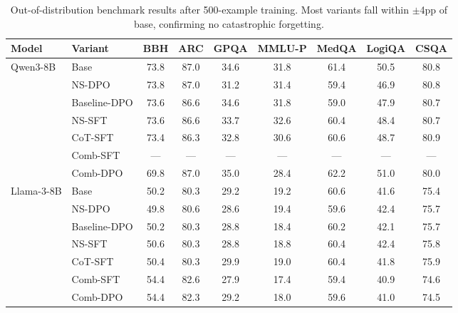 \begin{table}[t]
\centering
\caption{Out-of-distribution benchmark results after 500-example training. Most variants fall within $\pm$4pp of base, confirming no catastrophic forgetting.}
\label{tab:ood}
\small
\setlength{\tabcolsep}{3.5pt}
\begin{tabular}{ll ccccccc}
\toprule
Model & Variant & BBH & ARC & GPQA & MMLU-P & MedQA & LogiQA & CSQA \\
\midrule
Qwen3-8B & Base         & 73.8 & 87.0 & 34.6 & 31.8 & 61.4 & 50.5 & 80.8 \\
         & NS-DPO       & 73.8 & 87.0 & 31.2 & 31.4 & 59.4 & 46.9 & 80.8 \\
         & Baseline-DPO & 73.6 & 86.6 & 34.6 & 31.8 & 59.0 & 47.9 & 80.7 \\
         & NS-SFT       & 73.6 & 86.6 & 33.7 & 32.6 & 60.4 & 48.4 & 80.7 \\
         & CoT-SFT      & 73.4 & 86.3 & 32.8 & 30.6 & 60.6 & 48.7 & 80.9 \\
         & Comb-SFT     & --- & --- & --- & --- & --- & --- & --- \\
         & Comb-DPO     & 69.8 & 87.0 & 35.0 & 28.4 & 62.2 & 51.0 & 80.0 \\
\midrule
Llama-3-8B & Base       & 50.2 & 80.3 & 29.2 & 19.2 & 60.6 & 41.6 & 75.4 \\
           & NS-DPO     & 49.8 & 80.6 & 28.6 & 19.4 & 59.6 & 42.4 & 75.7 \\
           & Baseline-DPO & 50.2 & 80.3 & 28.8 & 18.4 & 60.2 & 42.1 & 75.7 \\
           & NS-SFT     & 50.6 & 80.3 & 28.8 & 18.8 & 60.4 & 42.4 & 75.8 \\
           & CoT-SFT    & 50.4 & 80.3 & 29.9 & 19.0 & 60.4 & 41.8 & 75.9 \\
           & Comb-SFT   & 54.4 & 82.6 & 27.9 & 17.4 & 59.4 & 40.9 & 74.6 \\
           & Comb-DPO   & 54.4 & 82.3 & 29.2 & 18.0 & 59.6 & 41.0 & 74.5 \\
\bottomrule
\end{tabular}
\end{table}

